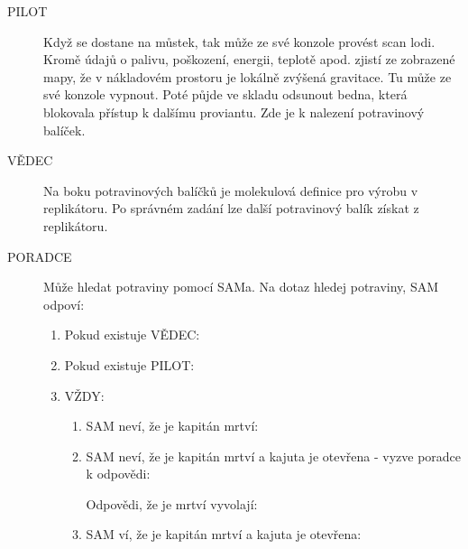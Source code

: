 \documentclass[11pt,oneside,a4paper]{article}
\begin{document}
\begin{description}
\item[PILOT] Když se dostane na můstek, tak může ze své konzole provést scan lodi. Kromě údajů o palivu, poškození, energii, teplotě apod. zjistí ze zobrazené mapy, že v nákladovém prostoru je lokálně zvýšená gravitace. Tu může ze své konzole vypnout. Poté půjde ve skladu odsunout bedna, která blokovala přístup k dalšímu proviantu. Zde je k nalezení potravinový balíček.
\item[VĚDEC] Na boku potravinových balíčků je molekulová definice pro výrobu v replikátoru. Po správném zadání lze další potravinový balík získat z replikátoru.
\item[PORADCE] Může hledat potraviny pomocí SAMa. Na dotaz hledej potraviny, SAM odpoví:
\begin{quote}
\end{quote}
\begin{enumerate}
\item Pokud existuje VĚDEC:
\begin{quote}
\end{quote}
\item Pokud existuje PILOT:
\begin{quote}
\end{quote}
\item VŽDY:
\begin{quote}
\end{quote}
\begin{enumerate}
\item SAM neví, že je kapitán mrtví:
\begin{quote}
\end{quote}
\item SAM neví, že je kapitán mrtví a kajuta je otevřena - vyzve poradce k odpovědi:
\begin{quote}
\end{quote}
Odpovědi, že je mrtví vyvolají:
\begin{quote}
\end{quote}
\item SAM ví, že je kapitán mrtví a kajuta je otevřena:
\begin{quote}
\end{quote}
\end{enumerate}
\end{enumerate}
\end{description}
\end{document}
